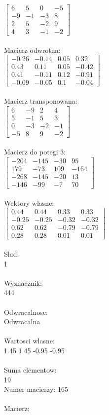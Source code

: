 \documentclass[a4paper,12pt]{article}
\begin{document}
$\begin{bmatrix} 6&5&0&-5\\-9&-1&-3&8\\2&5&-2&9\\4&3&-1&-2 \end{bmatrix}$
\\
\\
Macierz odwrotna:\\

$\begin{bmatrix} -0.26&-0.14&0.05&0.32\\0.43&0.11&0.05&-0.42\\0.41&-0.11&0.12&-0.91\\-0.09&-0.05&0.1&-0.04 \end{bmatrix}$
\\
\\
Macierz transponowana:\\

$\begin{bmatrix} 6&-9&2&4\\5&-1&5&3\\0&-3&-2&-1\\-5&8&9&-2 \end{bmatrix}$
\\
\\
Macierz do potegi 3:\\

$\begin{bmatrix} -204&-145&-30&95\\179&-73&109&-164\\-268&-145&-20&13\\-146&-99&-7&70 \end{bmatrix}$
\\
\\
Wektory wlasne:\\

$\begin{bmatrix} 0.44&0.44&0.33&0.33\\-0.25&-0.25&-0.32&-0.32\\0.62&0.62&-0.79&-0.79\\0.28&0.28&0.01&0.01 \end{bmatrix}$
\\
\\
Slad:\\
1
\\
\\
Wyznacznik:\\
444
\\
\\
Odwracalnosc:\\
Odwracalna
\\
\\
Wartosci wlasne:\\
1.45 1.45 -0.95 -0.95
\\
\\
Suma elementow:\\
19
\\
\newpage
Numer macierzy:
165
\\
\\
Macierz:\\
\end{document}
